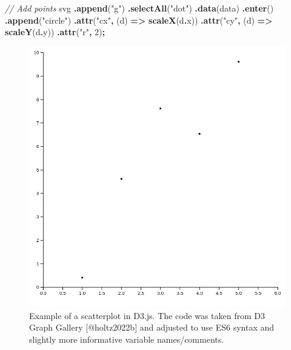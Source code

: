 \documentclass[
]{book}
\newenvironment{Shaded}{\begin{snugshade}}{\end{snugshade}}
\newcommand{\AttributeTok}[1]{\textcolor[rgb]{0.13,0.29,0.53}{#1}}
\newcommand{\CommentTok}[1]{\textcolor[rgb]{0.56,0.35,0.01}{\textit{#1}}}
\newcommand{\DecValTok}[1]{\textcolor[rgb]{0.00,0.00,0.81}{#1}}
\newcommand{\FunctionTok}[1]{\textcolor[rgb]{0.13,0.29,0.53}{\textbf{#1}}}
\newcommand{\KeywordTok}[1]{\textcolor[rgb]{0.13,0.29,0.53}{\textbf{#1}}}
\newcommand{\NormalTok}[1]{#1}
\newcommand{\OperatorTok}[1]{\textcolor[rgb]{0.81,0.36,0.00}{\textbf{#1}}}
\newcommand{\StringTok}[1]{\textcolor[rgb]{0.31,0.60,0.02}{#1}}
\begin{document}
\begin{Shaded}
\begin{Highlighting}[]
\CommentTok{// Add points}
\NormalTok{svg}
  \OperatorTok{.}\FunctionTok{append}\NormalTok{(}\StringTok{"g"}\NormalTok{)}
  \OperatorTok{.}\FunctionTok{selectAll}\NormalTok{(}\StringTok{"dot"}\NormalTok{)}
  \OperatorTok{.}\FunctionTok{data}\NormalTok{(data)}
  \OperatorTok{.}\FunctionTok{enter}\NormalTok{()}
  \OperatorTok{.}\FunctionTok{append}\NormalTok{(}\StringTok{"circle"}\NormalTok{)}
  \OperatorTok{.}\FunctionTok{attr}\NormalTok{(}\StringTok{"cx"}\OperatorTok{,}\NormalTok{ (d) }\KeywordTok{=\textgreater{}} \FunctionTok{scaleX}\NormalTok{(d}\OperatorTok{.}\AttributeTok{x}\NormalTok{))}
  \OperatorTok{.}\FunctionTok{attr}\NormalTok{(}\StringTok{"cy"}\OperatorTok{,}\NormalTok{ (d) }\KeywordTok{=\textgreater{}} \FunctionTok{scaleY}\NormalTok{(d}\OperatorTok{.}\AttributeTok{y}\NormalTok{))}
  \OperatorTok{.}\FunctionTok{attr}\NormalTok{(}\StringTok{"r"}\OperatorTok{,} \DecValTok{2}\NormalTok{)}\OperatorTok{;}
\end{Highlighting}
\end{Shaded}

\begin{figure}

{\centering \includegraphics[width=11.42in]{./figures/d3-scatterplot} 

}

\caption{Example of a scatterplot in D3.js. The code was taken from D3 Graph Gallery [@holtz2022b] and adjusted to use ES6 syntax and slightly more informative variable names/comments.}\label{fig:d3-scatterplot}
\end{figure}
\end{document}
